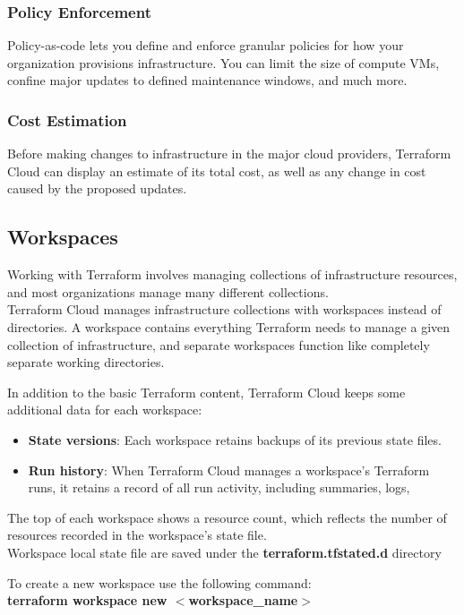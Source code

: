 \documentclass[12pt, letterpaper, twoside]{article}
\begin{document}
\subsubsection{Policy Enforcement}
Policy-as-code lets you define and enforce granular policies for how your organization provisions 
infrastructure. You can limit the size of compute VMs, confine major updates to defined maintenance 
windows, and much more.

\subsubsection{Cost Estimation}
Before making changes to infrastructure in the major cloud providers, Terraform Cloud can display an 
estimate of its total cost, as well as any change in cost caused by the proposed updates.

\subsection{Workspaces}
Working with Terraform involves managing collections of infrastructure resources, and most organizations 
manage many different collections.\\

Terraform Cloud manages infrastructure collections with workspaces instead of directories. A workspace 
contains everything Terraform needs to manage a given collection of infrastructure, and separate 
workspaces function like completely separate working directories.

In addition to the basic Terraform content, Terraform Cloud keeps some additional data for each workspace:
\begin{itemize}
	\item \textbf{State versions}: Each workspace retains backups of its previous state files.
	\item \textbf{Run history}: When Terraform Cloud manages a workspace's Terraform runs, it retains a 
		record of all run activity, including summaries, logs,
\end{itemize}
The top of each workspace shows a resource count, which reflects the number of resources recorded in the 
workspace’s state file.\\

Workspace local state file are saved under the \textbf{terraform.tfstated.d} directory

To create a new workspace use the following command:\\
\textbf{terraform workspace new $<$workspace\_name$>$}\\
\end{document}
